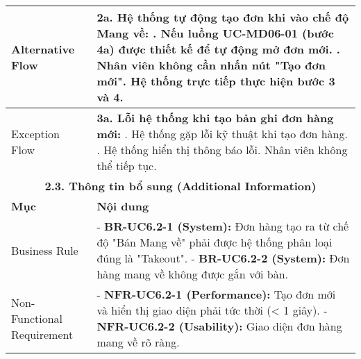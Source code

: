 \begin{longtable}{|m{4cm}|p{11cm}|}
\hline
Alternative Flow & \textbf{2a. Hệ thống tự động tạo đơn khi vào chế độ Mang về:} \newline    1. Nếu luồng UC-MD06-01 (bước 4a) được thiết kế để tự động mở đơn mới. \newline    2. Nhân viên không cần nhấn nút "Tạo đơn mới". Hệ thống trực tiếp thực hiện bước 3 và 4. \\
\hline
Exception Flow & \textbf{3a. Lỗi hệ thống khi tạo bản ghi đơn hàng mới:} \newline    1. Hệ thống gặp lỗi kỹ thuật khi tạo đơn hàng. \newline    2. Hệ thống hiển thị thông báo lỗi. Nhân viên không thể tiếp tục. \\
\hline
\multicolumn{2}{|c|}{\textbf{2.3. Thông tin bổ sung (Additional Information)}} \\
\hline
\textbf{Mục} & \textbf{Nội dung} \\
\hline
Business Rule & - \textbf{BR-UC6.2-1 (System):} Đơn hàng tạo ra từ chế độ "Bán Mang về" phải được hệ thống phân loại đúng là "Takeout". \newline - \textbf{BR-UC6.2-2 (System):} Đơn hàng mang về không được gắn với bàn. \\
\hline
Non-Functional Requirement & - \textbf{NFR-UC6.2-1 (Performance):} Tạo đơn mới và hiển thị giao diện phải tức thời (< 1 giây). \newline - \textbf{NFR-UC6.2-2 (Usability):} Giao diện đơn hàng mang về rõ ràng. \\
\hline
\end{longtable}

